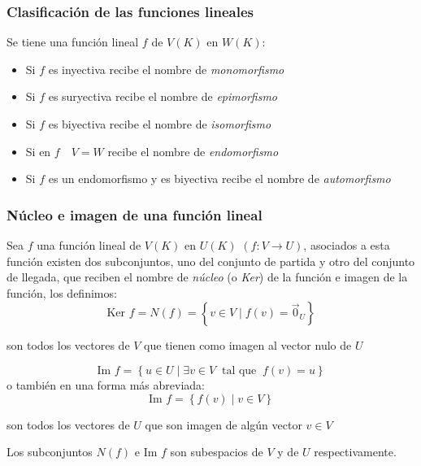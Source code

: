 \subsubsection{Clasificación de las funciones lineales}

Se tiene una función lineal \(f\) de \(V(K)\) en \(W(K)\):
\begin{itemize}
  \item Si \(f\) es inyectiva recibe el nombre de \textit{monomorfismo}
  \item Si \(f\) es suryectiva recibe el nombre de \textit{epimorfismo}
  \item Si \(f\) es biyectiva recibe el nombre de \textit{isomorfismo}
  \item Si en \(f \quad V=W\) recibe el nombre de \textit{endomorfismo}
  \item Si \(f\) es un endomorfismo y es biyectiva recibe el nombre de \textit{automorfismo} 
\end{itemize}

\subsubsection{Núcleo e imagen de una función lineal}

Sea \(f\) una función lineal de \(V(K)\) en \(U(K)\) \(\left(f:V\rightarrow U\right)\), asociados a esta función existen dos subconjuntos, uno del conjunto de partida y otro del conjunto de llegada, que reciben el nombre de \textit{núcleo} (o \textit{Ker}) de la función e imagen de la función, los definimos:
\[
\text{Ker } f = N(f) = \left\{ v \in V \mid f(v) = \vec{0}_U \right\}
\]
\begin{center}
  son todos los vectores de \(V\) que tienen como imagen al vector nulo de \(U\)
\end{center}
\[
\text{Im } f = \left\{u\in U \mid \exists v \in V ~\text{ tal que }~ f(v) = u \right\}
\]
o también en una forma más abreviada:
\[
\text{Im } f = \left\{f(v) \mid v \in V\right\}
\]
\begin{center}
  son todos los vectores de \(U\) que son imagen de algún vector \(v \in V\)
\end{center}

Los subconjuntos \(N(f)\) e \(\text{Im } f\) son subespacios de \(V\) y de \(U\) respectivamente.

